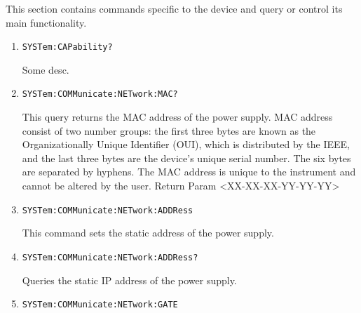 \documentclass[a4paper,10pt]{article}
\begin{document}
\begin{enumerate}
    \begin{description}
        \item This section contains commands specific to the device and query or control its main functionality.
    \end{description}
    \begin{enumerate}
        \item
            \begin{verbatim}SYSTem:CAPability?\end{verbatim}
            \begin{description}
                Some desc.
            \end{description}
        \item 
            \begin{verbatim}SYSTem:COMMunicate:NETwork:MAC?\end{verbatim}
            \begin{description}
                This query returns the MAC address of the power supply. MAC address consist of two number groups: the first three bytes are known as the Organizationally Unique Identifier (OUI), which is distributed by the IEEE, and the last three bytes are the device’s unique serial number. The six bytes are separated by hyphens. The MAC address is unique to the instrument and cannot be altered by the user.
                \newline
                Return Param <XX-XX-XX-YY-YY-YY>
		    \end{description}
		\item 
		    \begin{verbatim}SYSTem:COMMunicate:NETwork:ADDRess\end{verbatim}
		    \begin{description}
		        This command sets the static address of the power supply.
		    \end{description}
		\item 
		    \begin{verbatim}SYSTem:COMMunicate:NETwork:ADDRess?\end{verbatim}
		    \begin{description}
		        Queries the static IP address of the power supply.
		    \end{description}
		\item 
		    \begin{verbatim}SYSTem:COMMunicate:NETwork:GATE\end{verbatim}
		    \begin{description}

\end{description}
\end{enumerate}
\end{enumerate}
\end{document}
